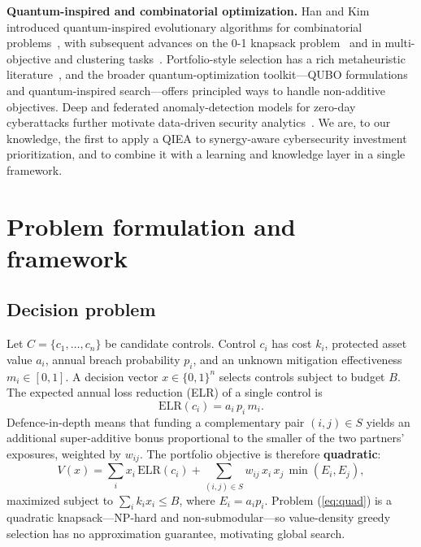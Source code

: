 \documentclass[preprint,12pt]{elsarticle}
\begin{document}
\textbf{Quantum-inspired and combinatorial optimization.} Han and Kim introduced
quantum-inspired evolutionary algorithms for combinatorial problems~\cite{han2002}, with
subsequent advances on the 0-1 knapsack problem~\cite{zhang2021} and in multi-objective
and clustering tasks~\cite{zhang2024,acampora2023}. Portfolio-style selection has a
rich metaheuristic literature~\cite{gupta2023}, and the broader quantum-optimization
toolkit---QUBO formulations~\cite{glover2019} and quantum-inspired search---offers
principled ways to handle non-additive objectives. Deep and federated anomaly-detection
models for zero-day cyberattacks further motivate data-driven security
analytics~\cite{schlor2023}. We are, to our knowledge, the first to apply a QIEA to
synergy-aware cybersecurity investment prioritization, and to combine it with a learning
and knowledge layer in a single framework.

\section{Problem formulation and framework}
\label{sec:framework}

\subsection{Decision problem}
\label{sec:formulation}
Let $C = \{c_1, \ldots, c_n\}$ be candidate controls. Control $c_i$ has cost $k_i$,
protected asset value $a_i$, annual breach probability $p_i$, and an unknown mitigation
effectiveness $m_i \in [0,1]$. A decision vector $x \in \{0,1\}^n$ selects controls
subject to budget $B$. The expected annual loss reduction (ELR) of a single control is
\begin{equation}
\label{eq:elr}
\mathrm{ELR}(c_i) = a_i \, p_i \, m_i .
\end{equation}
Defence-in-depth means that funding a complementary pair $(i,j) \in S$ yields an
additional super-additive bonus proportional to the smaller of the two partners'
exposures, weighted by $w_{ij}$. The portfolio objective is therefore
\textbf{quadratic}:
\begin{equation}
\label{eq:quad}
V(x) = \sum_{i} x_i \, \mathrm{ELR}(c_i)
     + \sum_{(i,j)\in S} w_{ij} \, x_i \, x_j \, \min(E_i, E_j),
\end{equation}
maximized subject to $\sum_i k_i x_i \le B$, where $E_i = a_i p_i$. Problem
(\ref{eq:quad}) is a quadratic knapsack---NP-hard and non-submodular---so value-density
greedy selection has no approximation guarantee, motivating global search.
\end{document}
